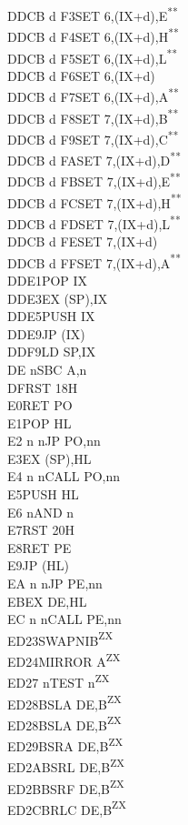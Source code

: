 \documentclass[twoside,openright,a4paper]{book}
\newcommand{\UNDOC}{\textnormal{\textsuperscript{**}}}
\newcommand{\ZXN}{\textnormal{\textsuperscript{ZX}}}
\begin{document}
\begin{multicols}{3}
{\begin{tabbing}
	DDCB d F3\>SET 6,(IX+d),E\UNDOC\\
	DDCB d F4\>SET 6,(IX+d),H\UNDOC\\
	DDCB d F5\>SET 6,(IX+d),L\UNDOC\\
	DDCB d F6\>SET 6,(IX+d)\\
	DDCB d F7\>SET 6,(IX+d),A\UNDOC\\
	DDCB d F8\>SET 7,(IX+d),B\UNDOC\\
	DDCB d F9\>SET 7,(IX+d),C\UNDOC\\
	DDCB d FA\>SET 7,(IX+d),D\UNDOC\\
	DDCB d FB\>SET 7,(IX+d),E\UNDOC\\
	DDCB d FC\>SET 7,(IX+d),H\UNDOC\\
	DDCB d FD\>SET 7,(IX+d),L\UNDOC\\
	DDCB d FE\>SET 7,(IX+d)\\
	DDCB d FF\>SET 7,(IX+d),A\UNDOC\\
	DDE1\>POP IX\\
	DDE3\>EX (SP),IX\\
	DDE5\>PUSH IX\\
	DDE9\>JP (IX)\\
	DDF9\>LD SP,IX\\
	DE n\>SBC A,n\\
	DF\>RST 18H\\
	E0\>RET PO\\
	E1\>POP HL\\
	E2 n n\>JP PO,nn\\
	E3\>EX (SP),HL\\
	E4 n n\>CALL PO,nn\\
	E5\>PUSH HL\\
	E6 n\>AND n\\
	E7\>RST 20H\\
	E8\>RET PE\\
	E9\>JP (HL)\\
	EA n n\>JP PE,nn\\
	EB\>EX DE,HL\\
	EC n n\>CALL PE,nn\\
	ED23\>SWAPNIB\ZXN\\
	ED24\>MIRROR A\ZXN\\
	ED27 n\>TEST n\ZXN\\
	ED28\>BSLA DE,B\ZXN\\
	ED28\>BSLA DE,B\ZXN\\
	ED29\>BSRA DE,B\ZXN\\
	ED2A\>BSRL DE,B\ZXN\\
	ED2B\>BSRF DE,B\ZXN\\
	ED2C\>BRLC DE,B\ZXN\\

\end{tabbing}}
\end{multicols}
\end{document}
